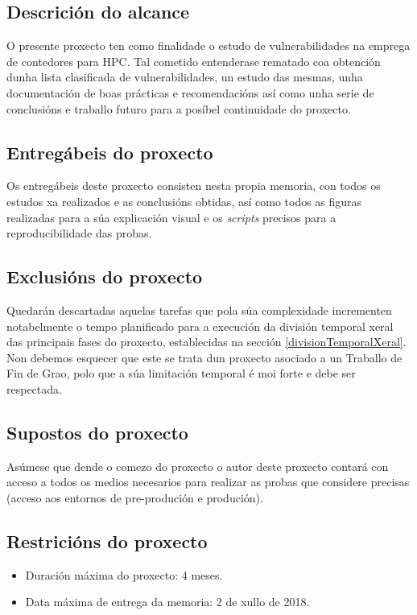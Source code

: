 \subsection{Descrición do alcance}

O presente proxecto ten como finalidade o estudo de vulnerabilidades na emprega de contedores para \gls{HPC}. Tal cometido entenderase rematado coa obtención dunha lista clasificada de vulnerabilidades, un estudo das mesmas, unha documentación de boas prácticas e recomendacións así como unha serie de conclusións e traballo futuro para a posíbel continuidade do proxecto.

\subsection{Entregábeis do proxecto}

Os entregábeis deste proxecto consisten nesta propia memoria, con todos os estudos xa realizados e as conclusións obtidas, así como todos as figuras realizadas para a súa explicación visual e os \textit{scripts} precisos para a reproducibilidade das probas.

\subsection{Exclusións do proxecto}

Quedarán descartadas aquelas tarefas que pola súa complexidade incrementen notabelmente o tempo planificado para a execución da división temporal xeral das principais fases do proxecto, establecidas na sección \ref{divisionTemporalXeral}. Non debemos esquecer que este se trata dun proxecto asociado a un Traballo de Fin de Grao, polo que a súa limitación temporal é moi forte e debe ser respectada.

\subsection{Supostos do proxecto}

Asúmese que dende o comezo do proxecto o autor deste proxecto contará con acceso a todos os medios necesarios para realizar as probas que considere precisas (acceso aos entornos de pre-produción e produción).

\subsection{Restricións do proxecto}

\begin{itemize}
    \item Duración máxima do proxecto: 4 meses.
    \item Data máxima de entrega da memoria: 2 de xullo de 2018.
\end{itemize}
